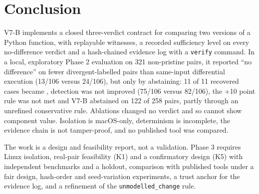 \section{Conclusion}\label{sec:conclusion}
V7-B implements a closed three-verdict contract for comparing two versions of a Python function, with replayable witnesses, a recorded sufficiency level on every no-difference verdict and a hash-chained evidence log with a \texttt{verify} command. In a local, exploratory Phase 2 evaluation on 321 non-pristine pairs, it reported ``no difference'' on fewer divergent-labelled pairs than same-input differential execution (13/106 versus 24/106), but only by abstaining: 11 of 11 recovered cases became \INS{}, detection was not improved (75/106 versus 82/106), the +10 point rule was not met and V7-B abstained on 122 of 258 pairs, partly through an unrefined conservative rule. Ablations changed no verdict and so cannot show component value. Isolation is macOS-only, determinism is incomplete, the evidence chain is not tamper-proof, and no published tool was compared.

The work is a design and feasibility report, not a validation. Phase 3 requires Linux isolation, real-pair feasibility (K1) and a confirmatory design (K5) with independent benchmarks and a holdout, comparison with published tools under a fair design, hash-order and seed-variation experiments, a trust anchor for the evidence log, and a refinement of the \texttt{unmodelled\_change} rule.
